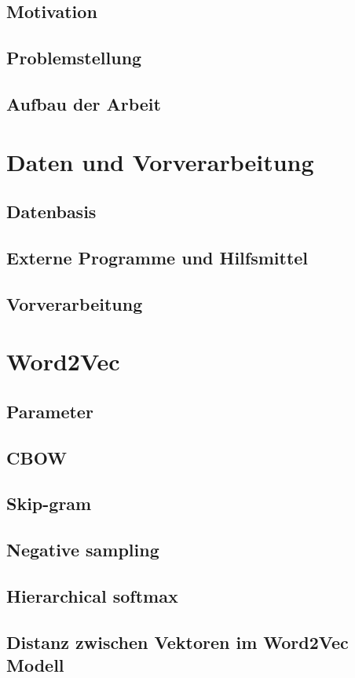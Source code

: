 \documentclass[12pt,a4paper]{report}
\begin{document}
	\section{Motivation}
	\section{Problemstellung}
	\section{Aufbau der Arbeit}

\newpage
\chapter{Daten und Vorverarbeitung}
	\section{Datenbasis}
	\section{Externe Programme und Hilfsmittel}
	\section{Vorverarbeitung}
\newpage
\chapter{Word2Vec}
	\section{Parameter}
	\section{CBOW}
	\section{Skip-gram}
	\section{Negative sampling}
	\section{Hierarchical softmax}
	\section{Distanz zwischen Vektoren im Word2Vec Modell}
\newpage
\end{document}
